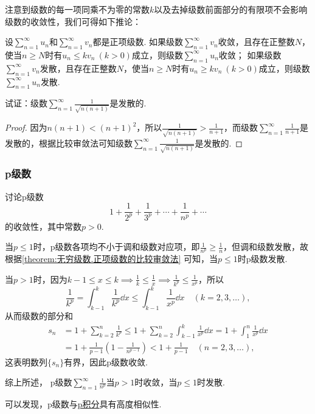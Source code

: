 注意到级数的每一项同乘不为零的常数\(k\)以及去掉级数前面部分的有限项不会影响级数的收敛性，我们可得如下推论：
\begin{corollary}\label{theorem:无穷级数.正项级数的比较审敛法的推论}
设\(\sum\limits_{n=1}^\infty u_n\)和\(\sum\limits_{n=1}^\infty v_n\)都是正项级数.
如果级数\(\sum\limits_{n=1}^\infty v_n\)收敛，且存在正整数\(N\)，使当\(n \geq N\)时有\(u_n \leq k v_n\ (k > 0)\)成立，则级数\(\sum\limits_{n=1}^\infty u_n\)收敛；
如果级数\(\sum\limits_{n=1}^\infty v_n\)发散，且存在正整数\(N\)，使当\(n \geq N\)时有\(u_n \geq k v_n\ (k > 0)\)成立，则级数\(\sum\limits_{n=1}^\infty u_n\)发散.
\end{corollary}

\begin{example}
试证：级数\(\sum\limits_{n=1}^\infty \frac{1}{\sqrt{n(n+1)}}\)是发散的.
\begin{proof}
因为\(n(n+1) < (n+1)^2\)，所以\(\frac{1}{\sqrt{n(n+1)}} > \frac{1}{n+1}\)，而级数\(\sum\limits_{n=1}^\infty \frac{1}{n+1}\)是发散的，根据比较审敛法可知级数\(\sum\limits_{n=1}^\infty \frac{1}{\sqrt{n(n+1)}}\)是发散的.
\end{proof}
\end{example}

\subsubsection{p级数}
\begin{example}\label{example:无穷级数.p级数的收敛性}
讨论p级数\[
1+\frac{1}{2^p}+\frac{1}{3^p}+\dotsb+\frac{1}{n^p}+\dotsb
\]的收敛性，其中常数\(p>0\).
\begin{solution}
当\(p \leq 1\)时，p级数各项均不小于调和级数对应项，即\(\frac{1}{n^p} \geq \frac{1}{n}\)，但调和级数发散，故根据\cref{theorem:无穷级数.正项级数的比较审敛法} 可知，当\(p \leq 1\)时p级数发散.

当\(p > 1\)时，因为\(k-1 \leq x \leq k \implies \frac{1}{k} \leq \frac{1}{x} \implies \frac{1}{k^p} \leq \frac{1}{x^p}\)，所以\[
\frac{1}{k^p}
= \int_{k-1}^k \frac{1}{k^p} \dd{x}
\leq \int_{k-1}^k \frac{1}{x^p} \dd{x}
\quad(k=2,3,\dotsc),
\]
从而级数的部分和
\begin{align*}
s_n &= 1 + \sum\limits_{k=2}^n{\frac{1}{k^p}}
\leq 1 + \sum\limits_{k=2}^n{ \int_{k-1}^k{\frac{1}{x^p}\dd{x}} }
= 1 + \int_1^n{\frac{1}{x^p}\dd{x}} \\
&= 1 + \frac{1}{p-1}\left(1-\frac{1}{n^{p-1}}\right)
< 1 + \frac{1}{p-1}
\quad(n=2,3,\dotsc),
\end{align*}
这表明数列\(\{s_n\}\)有界，因此p级数收敛.

综上所述，{\color{red} p级数\(\sum\limits_{n=1}^\infty \frac{1}{n^p}\)当\(p > 1\)时收敛，当\(p \leq 1\)时发散.}
\end{solution}
\end{example}
可以发现，p级数与\hyperref[example:定积分.p积分]{p积分}具有高度相似性.

